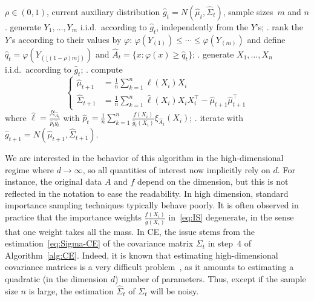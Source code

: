 \documentclass[]{article}
\newcommand{\npar}{{n}}
\theoremstyle{plain}
\theoremstyle{definition}
\begin{document}
\begin{algorithm}[t]
\caption{One iteration of CE} \label{alg:CE}
\begin{algorithmic}
\Require $\rho \in (0,1)$, current auxiliary distribution $\hat g_t = N(\hat \mu_t, \hat \Sigma_t)$, sample sizes~$m$ and $\npar$
. generate $Y_1, \ldots, Y_m$ i.i.d.\ according to $\hat g_t$, independently from the $Y$'s;
. rank the $Y$'s according to their values by $\varphi$: $\varphi(Y_{(1)}) \leq \cdots \leq \varphi(Y_{(m)})$ and define $\hat q_t = \varphi(Y_{(\lfloor (1-\rho) m\rfloor)})$ and $\hat A_t = \{x: \varphi(x) \geq \hat q_t\}$;
. generate $X_1, \ldots, X_\npar$ i.i.d.\ according to $\hat g_t$;
. compute
\begin{equation} \label{eq:Sigma-CE}
	\left\{ \begin{array}{rl}
		\hat \mu_{t+1} & \displaystyle = \frac{1}{\npar} \sum_{k=1}^{\npar} \ell(X_i) X_i\\
		\hat \Sigma_{t+1} & \displaystyle = \frac{1}{\npar} \sum_{k=1}^{\npar} \hat \ell(X_i) X_i X_i^\top - \hat \mu_{t+1} \hat \mu_{t+1}^\top
	\end{array} \right.
\end{equation}
where $\displaystyle \hat \ell = \frac{f \xi_{\hat A_t}}{\hat p_t \hat g_t}$ with $\displaystyle \hat p_t = \frac{1}{\npar} \sum_{k=1}^\npar \frac{f(X_i)}{\hat g_t(X_i)} \xi_{\hat A_t}(X_i)$;
. iterate with $\hat g_{t+1} = N(\hat \mu_{t+1}, \hat \Sigma_{t+1})$.
\end{algorithmic}
\end{algorithm}
%




We are interested in the behavior of this algorithm in the high-dimensional regime where $d \to \infty$, so all quantities of interest now implicitly rely on $d$. For instance, the original data $A$ and $f$ depend on the dimension, but this is not reflected in the notation to ease the readability. In high dimension, standard importance sampling techniques typically behave poorly. It is often observed in practice that the importance weights $\frac{f(X_i)}{g(X_i)}$ in~\eqref{eq:IS} degenerate, in the sense that one weight takes all the mass. In CE, the issue stems from the estimation~\eqref{eq:Sigma-CE} of the covariance matrix $\Sigma_t$ in step~$4$ of Algorithm~\ref{alg:CE}. Indeed, it is known that estimating high-dimensional covariance matrices is a very difficult problem~\cite{lam2019}, as it amounts to estimating a quadratic (in the dimension $d$) number of parameters. Thus, except if the sample size $\npar$ is large, the estimation $\hat \Sigma_t$ of $\Sigma_t$ will be noisy.
\end{document}
